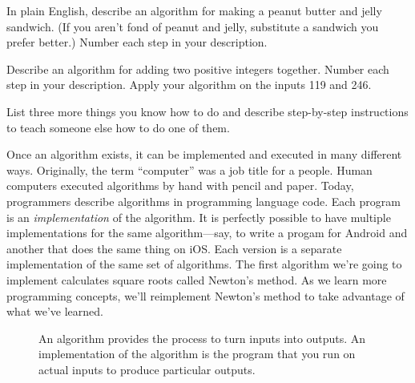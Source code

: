 \begin{question}
  In plain English, describe an algorithm for making a peanut butter and jelly sandwich. (If you aren't fond of peanut and jelly, substitute a sandwich you prefer better.) Number each step in your description.
\end{question}

\begin{question}
  Describe an algorithm for adding two positive integers together. Number each step in your description. Apply your algorithm on the inputs 119 and 246.
\end{question}

\begin{question}
  List three more things you know how to do and describe step-by-step instructions to teach someone else how to do one of them.
\end{question}

Once an algorithm exists, it can be implemented and executed in many different ways. Originally, the term ``computer'' was a job title for a people. Human computers executed algorithms by hand with pencil and paper. Today, programmers describe algorithms in programming language code. Each program is an \emph{implementation} of the algorithm. It is perfectly possible to have multiple implementations for the same algorithm---say, to write a progam for Android and another that does the same thing on iOS. Each version is a separate implementation of the same set of algorithms. The first algorithm we're going to implement calculates square roots called Newton's method. As we learn more programming concepts, we'll reimplement Newton's method to take advantage of what we've learned.

\begin{figure}
  
  \caption{\label{fig:intro-algorithm-fundemental-diagram} An algorithm provides the process to turn inputs into outputs. An implementation of the algorithm is the program that you run on actual inputs to produce particular outputs.}
\end{figure}

